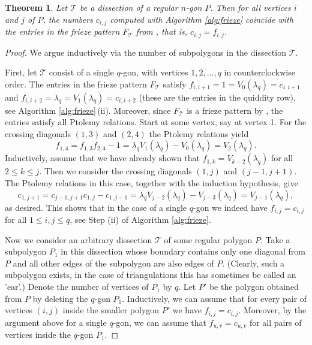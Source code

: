 \documentclass[11pt,a4paper]{amsart}
\newtheorem{Theorem}[Lemma]{Theorem}
\theoremstyle{definition}
\numberwithin{equation}{section}
\begin{document}
\begin{Theorem} \label{thm:BCIdissections}
Let $\mathcal{T}$ be a dissection of a regular $n$-gon $P$. 
Then for all vertices $i$ and $j$ of $P$,
the numbers $c_{i,j}$ computed with Algorithm \ref{alg:frieze} coincide with the entries in the 
frieze pattern $F_{\mathcal{T}}$ from \cite{HJ17}, that is, $c_{i,j}=f_{i,j}$.  
\end{Theorem}


\begin{proof}
We argue inductively via the number of subpolygons in the dissection $\mathcal{T}$. 

First, let $\mathcal{T}$ consist of a single $q$-gon, with vertices $1,2,\ldots,q$ in counterclockwise order. 
The entries in the frieze pattern $F_{\mathcal{T}}$ satisfy $f_{i,i+1}=1=V_0(\lambda_q)=c_{i,i+1}$ and 
$f_{i,i+2}=\lambda_q=V_1(\lambda_q)=c_{i,i+2}$
(these are the entries in the quiddity row), see Algorithm \ref{alg:frieze}\,(ii). Moreover, since $F_{\mathcal{T}}$ is a frieze pattern 
by \cite{HJ17}, the entries 
satisfy all Ptolemy relations. Start at some vertex, say at vertex 1. For the crossing diagonals $(1,3)$ and $(2,4)$
the Ptolemy relations yield
$$f_{1,4} = f_{1,3}f_{2,4} - 1 = \lambda_q V_1(\lambda_q) - V_0(\lambda_q) = V_2(\lambda_q).
$$
Inductively, assume that we have already shown that $f_{1,k}= V_{k-2}(\lambda_q)$ for all $2\le k\le j$. Then
we consider the crossing diagonals $(1,j)$ and $(j-1,j+1)$. The Ptolemy relations in this case, together with
the induction hypothesis, give
$$c_{1,j+1} = c_{j-1,j+1}c_{1,j} -c_{1,j-1} =  \lambda_q V_{j-2}(\lambda_q) - V_{j-3}(\lambda_q) = V_{j-1}(\lambda_q),
$$ 
as desired. This shows that in the case of a single $q$-gon we indeed have $f_{i,j}=c_{i,j}$ for all $1\le i,j\le q$,
see Step (ii) of Algorithm \ref{alg:frieze}.
\smallskip

Now we consider an arbitrary dissection $\mathcal{T}$ of some regular polygon $P$. Take a subpolygon 
$P_1$ in this dissection whose 
boundary contains only one diagonal from $P$ and all other edges of the subpolygon are also edges of $P$. 
(Clearly, such a subpolygon exists, in the case of triangulations this has sometimes be called an 'ear'.) 
Denote the number of vertices of $P_1$ by $q$. 
Let $P'$ be the polygon obtained from $P$ by deleting the $q$-gon $P_1$. Inductively, we can assume that
for every pair of vertices $(i,j)$ inside the smaller polygon $P'$ we have $f_{i,j}=c_{i,j}$. Moreover,
by the argument above for a single $q$-gon, we can assume that $f_{u,v}=c_{u,v}$ for all pairs of vertices
inside the $q$-gon $P_1$. 


\end{proof}
\end{document}
